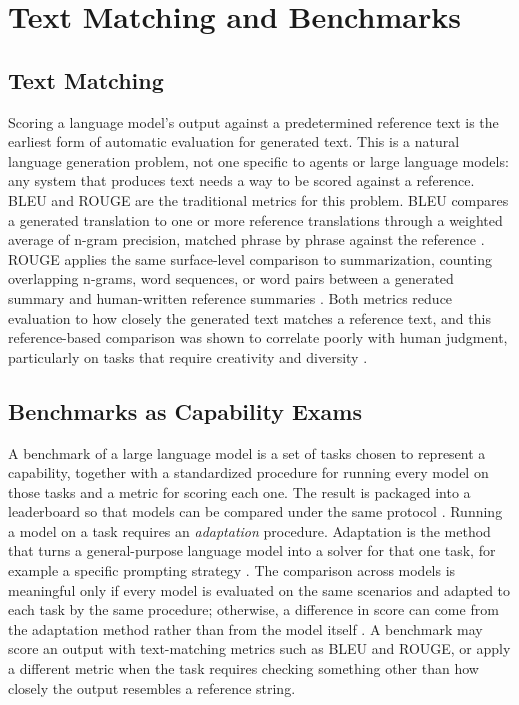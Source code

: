\section{Text Matching and Benchmarks}
\label{sec:text-matching-benchmarks}

\subsection{Text Matching}
\label{sec:text-matching}

Scoring a language model's output against a predetermined reference text is the earliest form of automatic evaluation for generated text. This is a natural language generation problem, not one specific to agents or large language models: any system that produces text needs a way to be scored against a reference. BLEU and ROUGE are the traditional metrics for this problem. BLEU compares a generated translation to one or more reference translations through a weighted average of n-gram precision, matched phrase by phrase against the reference \cite{papineniBleuMethodAutomatic2002}. ROUGE applies the same surface-level comparison to summarization, counting overlapping n-grams, word sequences, or word pairs between a generated summary and human-written reference summaries \cite{linROUGEPackageAutomatic2004}. Both metrics reduce evaluation to how closely the generated text matches a reference text, and this reference-based comparison was shown to correlate poorly with human judgment, particularly on tasks that require creativity and diversity \cite{liuGEvalNLGEvaluation2023}.

\subsection{Benchmarks as Capability Exams}
\label{sec:benchmarks-capability-exams}

A benchmark of a large language model is a set of tasks chosen to represent a capability, together with a standardized procedure for running every model on those tasks and a metric for scoring each one. The result is packaged into a leaderboard so that models can be compared under the same protocol \cite{liangHolisticEvaluationLanguage2023}. Running a model on a task requires an \emph{adaptation} procedure. Adaptation is the method that turns a general-purpose language model into a solver for that one task, for example a specific prompting strategy \cite{liangHolisticEvaluationLanguage2023}. The comparison across models is meaningful only if every model is evaluated on the same scenarios and adapted to each task by the same procedure; otherwise, a difference in score can come from the adaptation method rather than from the model itself \cite{liangHolisticEvaluationLanguage2023}. A benchmark may score an output with text-matching metrics such as BLEU and ROUGE, or apply a different metric when the task requires checking something other than how closely the output resembles a reference string.

